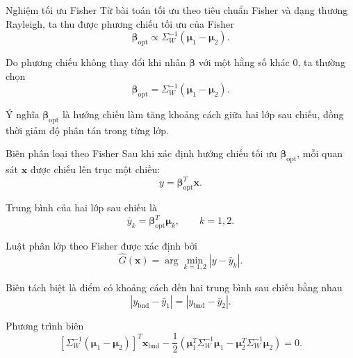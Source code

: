 \documentclass{beamer}
\def\bsx{\bm{x}}
\begin{document}
\begin{frame}{Nghiệm tối ưu Fisher}
	Từ bài toán tối ưu theo tiêu chuẩn Fisher và dạng thương Rayleigh, ta thu được phương chiếu tối ưu của Fisher
	\begin{equation}
		\bm{\beta}_{\text{opt}}
		\propto
		\Sigma_W^{-1}(\bm{\mu}_1-\bm{\mu}_2).
		\tag{4}
	\end{equation}
	
	Do phương chiếu không thay đổi khi nhân \(\bm{\beta}\) với một hằng số khác \(0\), ta thường chọn
	\begin{equation}
		\bm{\beta}_{\text{opt}}
		=
		\Sigma_W^{-1}(\bm{\mu}_1-\bm{\mu}_2).
		\tag{5}
	\end{equation}
	
	\begin{block}{Ý nghĩa}
		\(\bm{\beta}_{\text{opt}}\) là hướng chiếu làm tăng khoảng cách giữa hai lớp sau chiếu,
		đồng thời giảm độ phân tán trong từng lớp.
	\end{block}
\end{frame}


\begin{frame}{Biên phân loại theo Fisher}
	Sau khi xác định hướng chiếu tối ưu \(\bm{\beta}_{\text{opt}}\), mỗi quan sát \(\bsx\) được chiếu lên trục một chiều:
	\begin{equation}
		y=\bm{\beta}_{\text{opt}}^T\bsx.
		\tag{6}
	\end{equation}
	
	Trung bình của hai lớp sau chiếu là
	\[
	\bar{y}_k=\bm{\beta}_{\text{opt}}^T\bm{\mu}_k,
	\qquad k=1,2.
	\]
	
	Luật phân lớp theo Fisher được xác định bởi
	\begin{equation}
		\widehat{G}(\bsx)
		=
		\arg\min_{k=1,2}
		\left|y-\bar{y}_k\right|.
		\tag{7}
	\end{equation}
	
	Biên tách biệt là điểm có khoảng cách đến hai trung bình sau chiếu bằng nhau
	\begin{equation}
		\left|
		y_{\text{bnd}}-\bar{y}_1
		\right|
		=
		\left|
		y_{\text{bnd}}-\bar{y}_2
		\right|.
		\tag{8}
	\end{equation}
	
	\begin{block}{Phương trình biên} \begin{equation} \left[ \Sigma_W^{-1}(\bm{\mu}_1-\bm{\mu}_2) \right]^T \bsx_{\text{bnd}} - \frac{1}{2} \left( \bm{\mu}_1^T\Sigma_W^{-1}\bm{\mu}_1 - \bm{\mu}_2^T\Sigma_W^{-1}\bm{\mu}_2 \right) =0. \tag{9} \end{equation} \end{block}
\end{frame}
\end{document}
